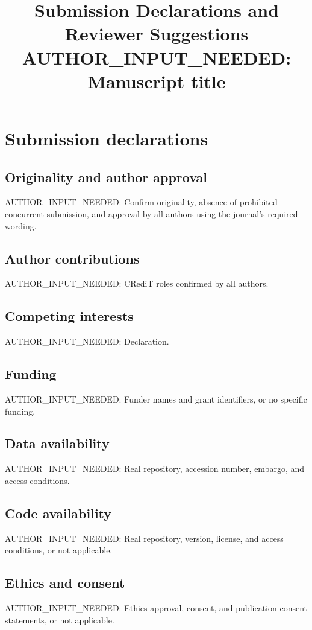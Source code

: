 \documentclass[10pt]{article}
\title{Submission Declarations and Reviewer Suggestions\\
\large AUTHOR\_INPUT\_NEEDED: Manuscript title}
\author{}
\date{}
\begin{document}
\maketitle

\section*{Submission declarations}

\subsection*{Originality and author approval}
AUTHOR\_INPUT\_NEEDED: Confirm originality, absence of prohibited concurrent
submission, and approval by all authors using the journal's required wording.

\subsection*{Author contributions}
AUTHOR\_INPUT\_NEEDED: CRediT roles confirmed by all authors.

\subsection*{Competing interests}
AUTHOR\_INPUT\_NEEDED: Declaration.

\subsection*{Funding}
AUTHOR\_INPUT\_NEEDED: Funder names and grant identifiers, or no specific funding.

\subsection*{Data availability}
AUTHOR\_INPUT\_NEEDED: Real repository, accession number, embargo, and access conditions.

\subsection*{Code availability}
AUTHOR\_INPUT\_NEEDED: Real repository, version, license, and access conditions, or not applicable.

\subsection*{Ethics and consent}
AUTHOR\_INPUT\_NEEDED: Ethics approval, consent, and publication-consent statements, or not applicable.
\end{document}
